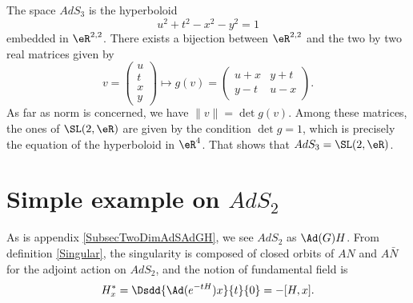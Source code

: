 The space $AdS_3$ is the hyperboloid 
\begin{equation} \label{hyperboloide}
 u^2 + t^2 - x^2 - y^2 = 1
 \end{equation}
embedded in $\eR^{2,2}$. There exists a bijection between $\eR^{2,2}$ and the two by two real matrices given by
\[ 
 v= \begin{pmatrix}
u\\t\\x\\y
\end{pmatrix}
\mapsto
g(v)=\begin{pmatrix}
u+x&y+t\\
y-t&u-x
\end{pmatrix}.
\]
As far as norm is concerned, we have $\| v \|=\det g(v)$. Among these matrices, the ones of $\SL(2,\eR)$ are given by the condition $\det g=1$, which is precisely the equation of the hyperboloid in $\eR^{4}$. That shows that $AdS_3=\SL(2,\eR)$.



\section{Simple example on \texorpdfstring{$AdS_{2}$}{AdS2}}\label{sec_AdSdeux}

As is appendix \ref{SubsecTwoDimAdSAdGH}, we see $AdS_2$ as $\Ad(G)H$.  From definition \ref{Singular}, the singularity is composed of closed orbits of $AN$ and $A\bar{N}$ for the adjoint action on $AdS_2$, and the notion of fundamental field is
\begin{equation}
H^*_x=\Dsdd{\Ad(e^{-tH})x}{t}{0} =-[H,x].
\end{equation}

